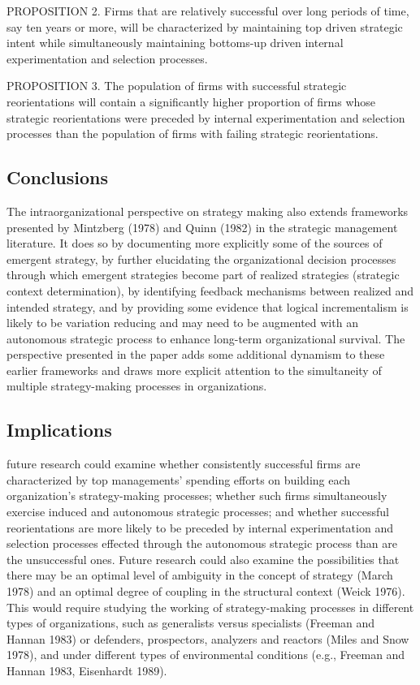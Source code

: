 \documentclass[12pt,letterpaper]{article}
\begin{document}
PROPOSITION 2. Firms that are relatively successful over long periods of time, say ten years or more, will be characterized by maintaining top driven strategic intent while simultaneously maintaining bottoms-up driven internal experimentation and selection processes.

PROPOSITION 3. The population of firms with successful strategic reorientations will contain a significantly higher proportion of firms whose strategic reorientations were preceded by internal experimentation and selection processes than the population of firms with failing strategic reorientations.

\subsection{\cite{Burgelman1991} Conclusions}
The intraorganizational perspective on strategy making also extends frameworks presented by Mintzberg (1978) and Quinn (1982) in the strategic management literature. It does so by documenting more explicitly some of the sources of emergent strategy, by further elucidating the organizational decision processes through which emergent strategies become part of realized strategies (strategic context determination), by identifying feedback mechanisms between realized and intended strategy, and by providing some evidence that logical incrementalism is likely to be variation reducing and may need to be augmented with an autonomous strategic process to enhance long-term organizational survival. The perspective presented in the paper adds some additional dynamism to these earlier frameworks and draws more explicit attention to the simultaneity of multiple strategy-making processes in organizations.

\subsection{\cite{Burgelman1991} Implications}
future research could examine whether consistently successful firms are characterized by top managements' spending efforts on building each organization's strategy-making processes; whether such firms simultaneously exercise induced and autonomous strategic processes; and whether successful reorientations are more likely to be preceded by internal experimentation and selection processes effected through the autonomous strategic process than are the unsuccessful ones. Future research could also examine the possibilities that there may be an optimal level of ambiguity in the concept of strategy (March 1978) and an optimal degree of coupling in the structural context (Weick 1976). This would require studying the working of strategy-making processes in different types of organizations, such as generalists versus specialists (Freeman and Hannan 1983) or defenders, prospectors, analyzers and reactors (Miles and Snow 1978), and under different types of environmental conditions (e.g., Freeman and Hannan 1983, Eisenhardt 1989). 
\end{document}
